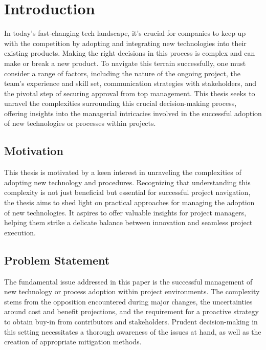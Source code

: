 \documentclass{article}
\begin{document}
\section{Introduction}
In today's fast-changing tech landscape, it's crucial for companies to keep up with the competition by adopting and integrating new technologies into their existing products. Making the right decisions in this process is complex and can make or break a new product. To navigate this terrain successfully, one must consider a range of factors, including the nature of the ongoing project, the team's experience and skill set, communication strategies with stakeholders, and the pivotal step of securing approval from top management. This thesis seeks to unravel the complexities surrounding this crucial decision-making process, offering insights into the managerial intricacies involved in the successful adoption of new technologies or processes within projects.


\subsection{Motivation}
This thesis is motivated by a keen interest in unraveling the complexities of adopting new technology and procedures. Recognizing that understanding this complexity is not just beneficial but essential for successful project navigation, the thesis aims to shed light on practical approaches for managing the adoption of new technologies. It aspires to offer valuable insights for project managers, helping them strike a delicate balance between innovation and seamless project execution.

\subsection{Problem Statement}
The fundamental issue addressed in this paper is the successful management of new technology or process adoption within project environments. The complexity stems from the opposition encountered during major changes, the uncertainties around cost and benefit projections, and the requirement for a proactive strategy to obtain buy-in from contributors and stakeholders. Prudent decision-making in this setting necessitates a thorough awareness of the issues at hand, as well as the creation of appropriate mitigation methods.
\end{document}

